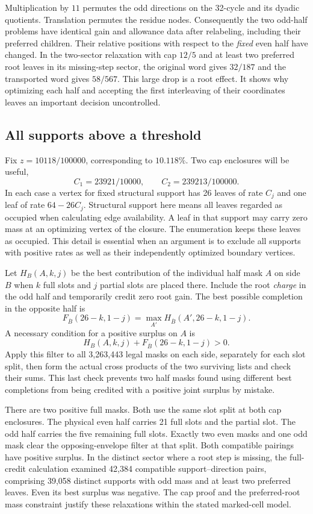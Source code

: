 \documentclass[12pt,letterpaper]{article}
\begin{document}
Multiplication by \(11\) permutes the odd directions on the 32-cycle and its dyadic quotients. Translation permutes the residue nodes. Consequently the two odd-half problems have identical gain and allowance data after relabeling, including their preferred children. Their relative positions with respect to the \emph{fixed} even half have changed. In the two-sector relaxation with cap \(12/5\) and at least two preferred root leaves in its missing-step sector, the original word gives \(32/187\) and the transported word gives \(58/567\). This large drop is a root effect. It shows why optimizing each half and accepting the first interleaving of their coordinates leaves an important decision uncontrolled.

\subsection{All supports above a threshold}

Fix \(z=10118/100000\), corresponding to \(10.118\%\). Two cap enclosures will be useful,
\[
  C_1=23921/10000,\qquad C_2=239213/100000.
\]
In each case a vertex for fixed structural support has 26 leaves of rate \(C_j\) and one leaf of rate \(64-26C_j\). Structural support here means all leaves regarded as occupied when calculating edge availability. A leaf in that support may carry zero mass at an optimizing vertex of the closure. The enumeration keeps these leaves as occupied. This detail is essential when an argument is to exclude all supports with positive rates as well as their independently optimized boundary vertices.

Let \(H_B(A,k,j)\) be the best contribution of the individual half mask \(A\) on side \(B\) when \(k\) full slots and \(j\) partial slots are placed there. Include the root \emph{charge} in the odd half and temporarily credit zero root gain. The best possible completion in the opposite half is
\[
       F_{\overline B}(26-k,1-j)=
       \max_{A'} H_{\overline B}(A',26-k,1-j).
\]
A necessary condition for a positive surplus on \(A\) is
\[
        H_B(A,k,j)+F_{\overline B}(26-k,1-j)>0.
\]
Apply this filter to all 3,263,443 legal masks on each side, separately for each slot split, then form the actual cross products of the two surviving lists and check their sums. This last check prevents two half masks found using different best completions from being credited with a positive joint surplus by mistake.

There are two positive full masks. Both use the same slot split at both cap enclosures. The physical even half carries 21 full slots and the partial slot. The odd half carries the five remaining full slots. Exactly two even masks and one odd mask clear the opposing-envelope filter at that split. Both compatible pairings have positive surplus. In the distinct sector where a root step is missing, the full-credit calculation examined 42,384 compatible support--direction pairs, comprising 39,058 distinct supports with odd mass and at least two preferred leaves. Even its best surplus was negative. The cap proof and the preferred-root mass constraint justify these relaxations within the stated marked-cell model.
\end{document}
